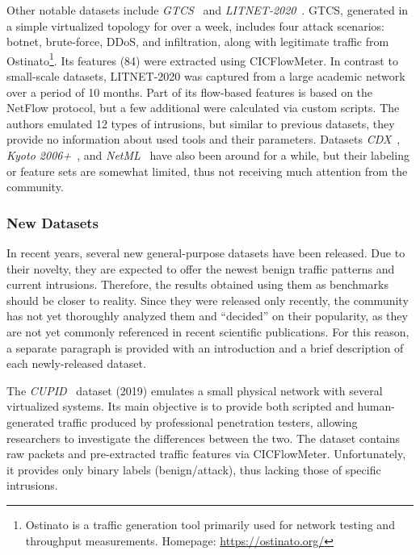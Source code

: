 Other notable datasets include \emph{GTCS}~\cite{mahfouz2020_gtcs} and \emph{LITNET-2020}~\cite{damasevicius2020_litnet2020}. GTCS, generated in a simple virtualized topology for over a week, includes four attack scenarios: botnet, brute-force, DDoS, and infiltration, along with legitimate traffic from Ostinato\footnote{Ostinato is a traffic generation tool primarily used for network testing and throughput measurements. Homepage: \url{https://ostinato.org/}}. Its features (84) were extracted using CICFlowMeter. In contrast to small-scale datasets, LITNET-2020 was captured from a large academic network over a period of 10 months. Part of its flow-based features is based on the NetFlow protocol, but a few additional were calculated via custom scripts. The authors emulated 12 types of intrusions, but similar to previous datasets, they provide no information about used tools and their parameters. Datasets \emph{CDX}~\cite{sangster2009_cdx_dataset}, \emph{Kyoto 2006+}~\cite{song2011_kyoto_dataset}, and \emph{NetML}~\cite{barut2020_netml_dataset} have also been around for a while, but their labeling or feature sets are somewhat limited, thus not receiving much attention from the community.

\subsubsection{New Datasets}
\label{sssec:ndatasurv_general_new}

In recent years, several new general-purpose datasets have been released. Due to their novelty, they are expected to offer the newest benign traffic patterns and current intrusions. Therefore, the results obtained using them as benchmarks should be closer to reality. Since they were released only recently, the community has not yet thoroughly analyzed them and ``decided'' on their popularity, as they are not yet commonly referenced in recent scientific publications. For this reason, a separate paragraph is provided with an introduction and a brief description of each newly-released dataset.

The \emph{CUPID}~\cite{lawrence2022_cupid} dataset (2019) emulates a small physical network with several virtualized systems. Its main objective is to provide both scripted and human-generated traffic produced by professional penetration testers, allowing researchers to investigate the differences between the two. The dataset contains raw packets and pre-extracted traffic features via CICFlowMeter. Unfortunately, it provides only binary labels (benign/attack), thus lacking those of specific intrusions.

